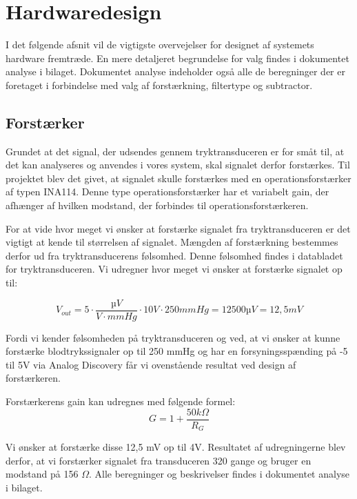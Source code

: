 \section{Hardwaredesign}
\vspace{0.5cm}
I det følgende afsnit vil de vigtigste overvejelser for designet af systemets hardware fremtræde. En mere detaljeret begrundelse for valg findes i dokumentet analyse i bilaget. Dokumentet analyse indeholder også alle de beregninger der er foretaget i forbindelse med valg af forstærkning, filtertype og subtractor.

\subsection{Forstærker}
\vspace{0.5cm}
Grundet at det signal, der udsendes gennem tryktransduceren er for småt til, at det kan analyseres og anvendes i vores system, skal signalet derfor forstærkes. Til projektet blev det givet, at signalet skulle forstærkes med en operationsforstærker af typen INA114. Denne type operationsforstærker har et variabelt gain, der afhænger af hvilken modstand, der forbindes til operationsforstærkeren.

For at vide hvor meget vi ønsker at forstærke signalet fra tryktransduceren er det vigtigt at kende til størrelsen af signalet. Mængden af forstærkning bestemmes derfor ud fra tryktransducerens følsomhed. Denne følsomhed findes i databladet for tryktransduceren. Vi udregner hvor meget vi ønsker at forstærke signalet op til:
  
\[ V_{out} =5\cdot\frac{µV}{V\cdot mmHg} \cdot 10 V \cdot 250 mmHg = 12500 µV = 12,5 mV\]

Fordi vi kender følsomheden på tryktransduceren og ved, at vi ønsker at kunne forstærke blodtrykssignaler op til 250 mmHg og har en forsyningsspænding på -5 til 5V via Analog Discovery får vi ovenstående resultat ved design af forstærkeren.

Forstærkerens gain kan udregnes med følgende formel: 
\[ G = 1+\frac{50k\Omega}{R_{G}} \]

Vi ønsker at forstærke disse 12,5 mV op til 4V. Resultatet af udregningerne blev derfor, at vi forstærker signalet fra transduceren 320 gange og bruger en modstand på 156 $\Omega$. Alle beregninger og beskrivelser findes i dokumentet analyse i bilaget.   

